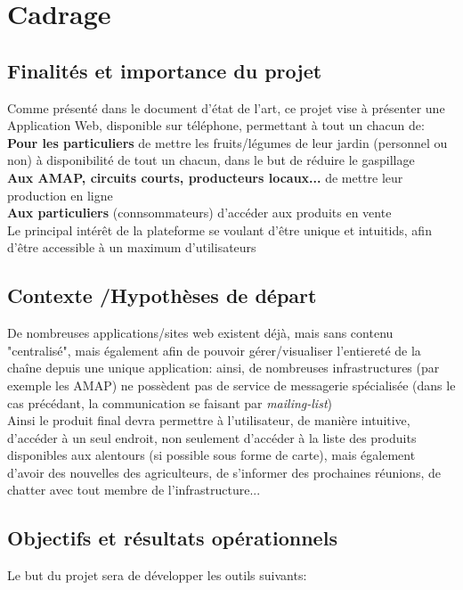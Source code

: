 \usepackage{graphicx}
\graphicspath{ {./images/} }
\chapter*{Cadrage}

\section*{Finalités et importance du projet}
Comme présenté dans le document d'état de l'art, ce projet vise à présenter une Application Web, disponible sur téléphone, permettant à tout un chacun de: \\
	\textbf{Pour les particuliers} de mettre les fruits/légumes de leur jardin (personnel ou non) à disponibilité de tout un chacun, dans le but de réduire le gaspillage \\
	\textbf{Aux AMAP, circuits courts, producteurs locaux...} de mettre leur production en ligne \\
	\textbf{Aux particuliers} (connsommateurs) d'accéder aux produits en vente\\

Le principal intérêt de la plateforme se voulant d'être unique et intuitids, afin d'être accessible à un maximum d'utilisateurs

\section*{Contexte /Hypothèses de départ}
De nombreuses applications/sites web existent déjà, mais sans contenu "centralisé", mais également afin de pouvoir gérer/visualiser l'entiereté de la chaîne depuis une unique application: ainsi, de nombreuses infrastructures (par exemple les AMAP) ne possèdent pas de service de messagerie spécialisée (dans le cas précédant, la communication se faisant par \textit{mailing-list})\\
Ainsi le produit final devra permettre à l'utilisateur, de manière intuitive, d'accéder à un seul endroit, non seulement d'accéder à la liste des produits disponibles aux alentours (si possible sous forme de carte), mais également d'avoir des nouvelles des agriculteurs, de s'informer des prochaines réunions, de chatter avec tout membre de l'infrastructure...

\section*{Objectifs et résultats opérationnels}
Le but du projet sera de développer les outils suivants:


